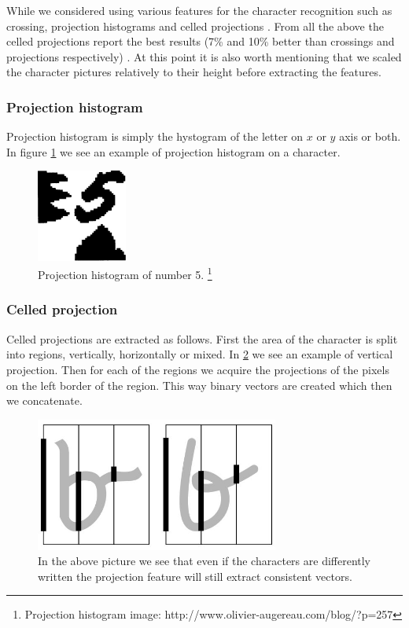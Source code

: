 While we considered using various features for the character recognition such as crossing, projection histograms and celled projections \cite{HWR:features1}\cite{HWR:features2}. From all the above the celled projections report the best results (7\% and 10\% better than crossings and projections respectively) \cite{HWR:features1}. At this point it is also worth mentioning that we scaled the character pictures relatively to their height before extracting the features.


\subsubsection{Projection histogram}
Projection histogram \cite{Chacko2015} is simply the hystogram of the letter on $x$ or $y$ axis or both. In figure \ref{fig:method:features:hist_proj} we see an example of projection histogram on a character.

\begin{figure}[ht]
	\centering
	\includegraphics[width=8em]{shared/img/hist_project.png}
	\caption{Projection histogram of number 5. \footnote{Projection histogram image: http://www.olivier-augereau.com/blog/?p=257}}
	\label{fig:method:features:hist_proj}
\end{figure}




\subsubsection{Celled projection}
Celled projections are extracted as follows. First the area of the character is split into regions, vertically, horizontally or mixed. In \ref{fig:method:features:feature} we see an example of vertical projection. Then for each of the regions we acquire the projections of the pixels on the left border of the region. This way binary vectors are created which then we concatenate.

\begin{figure}[ht]
	\includegraphics[width=8cm]{shared/img/projection_letter.jpg}
	\caption{In the above picture we see that even if the characters are differently written the projection feature will still extract consistent vectors.}
	\label{fig:method:features:feature}
\end{figure}

